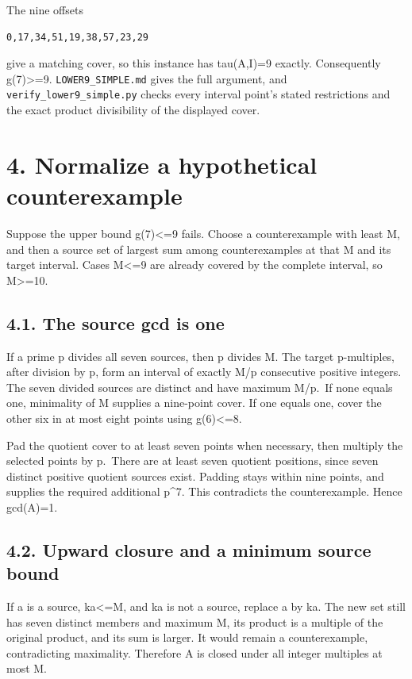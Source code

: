 \documentclass[11pt,a4paper]{article}
\begin{document}
The nine offsets

\begin{verbatim}
0,17,34,51,19,38,57,23,29
\end{verbatim}

give a matching cover, so this instance has tau(A,I)=9 exactly.
Consequently g(7)\textgreater=9. \nolinkurl{LOWER9_SIMPLE.md} gives the
full argument, and \nolinkurl{verify_lower9_simple.py} checks every
interval point's stated restrictions and the exact product divisibility
of the displayed cover.

\section{4. Normalize a hypothetical
counterexample}\label{normalize-a-hypothetical-counterexample}

Suppose the upper bound g(7)\textless=9 fails. Choose a counterexample
with least M, and then a source set of largest sum among counterexamples
at that M and its target interval. Cases M\textless=9 are already
covered by the complete interval, so M\textgreater=10.

\subsection{4.1. The source gcd is one}\label{the-source-gcd-is-one}

If a prime p divides all seven sources, then p divides M. The target
p-multiples, after division by p, form an interval of exactly M/p
consecutive positive integers. The seven divided sources are distinct
and have maximum M/p.~If none equals one, minimality of M supplies a
nine-point cover. If one equals one, cover the other six in at most
eight points using g(6)\textless=8.

Pad the quotient cover to at least seven points when necessary, then
multiply the selected points by p.~There are at least seven quotient
positions, since seven distinct positive quotient sources exist. Padding
stays within nine points, and supplies the required additional p\^{}7.
This contradicts the counterexample. Hence gcd(A)=1.

\subsection{4.2. Upward closure and a minimum source
bound}\label{upward-closure-and-a-minimum-source-bound}

If a is a source, ka\textless=M, and ka is not a source, replace a by
ka. The new set still has seven distinct members and maximum M, its
product is a multiple of the original product, and its sum is larger. It
would remain a counterexample, contradicting maximality. Therefore A is
closed under all integer multiples at most M.
\end{document}
